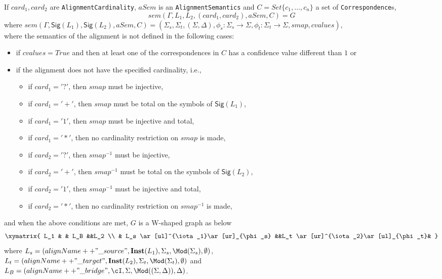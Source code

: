 \documentclass[10pt, a4paper]{isov2}
\newcommand*{\syntax}[1]{\texttt{#1}}
\newcommand{\Sig}{\mathsf{Sig}}
\newcommand{\Inst}{\ensuremath{\mathbf{Inst}}}
\begin{document}
If $card_1, card_2$ are \syntax{AlignmentCardinality},
$aSem$ is an \syntax{AlignmentSemantics}
and $C = Set\{c_1, \ldots, c_n\}$ a set of \syntax{Correspondence}s,
$$sem(\Gamma, L_1, L_2, (card_1,card_2), aSem, C)=
G$$
\noindent
where
$sem(\Gamma, \Sig(L_1),\Sig(L_2), aSem, C) = (\Sigma_s,\Sigma_t,(\Sigma,\Delta),\phi_s:\Sigma_s\to\Sigma,\phi_t:\Sigma_t\to\Sigma, smap, cvalues)$,\\
where the semantics of the alignment is not defined in the following cases:
\begin{itemize}
\item
if $cvalues = True$ and then at least one of the correspondences in $C$ has a confidence value different than $1$ or
\item if the alignment does not have the specified cardinality, i.e.,
\begin{itemize}
\item if $card_1 = '?'$, then $smap$ must be injective,
\item if $card_1 = '+'$, then $smap$ must be total on the symbols of $\Sig(L_1)$,
\item if $card_1 = '1'$, then $smap$ must be injective and total,
\item if $card_1 = '*'$, then no cardinality restriction on $smap$ is made,
\end{itemize}
\begin{itemize}
\item if $card_2 = '?'$, then $smap^{-1}$ must be injective,
\item if $card_2 = '+'$, then $smap^{-1}$ must be total on the symbols of $\Sig(L_2)$,
\item if $card_2 = '1'$, then $smap^{-1}$ must be injective and total,
\item if $card_2 = '*'$, then no cardinality restriction on $smap^{-1}$ is made,
\end{itemize}
\end{itemize}
\noindent and when the above conditions are met,
$G$ is a W-shaped graph as below
$$
\xymatrix{
L_1 & &  L_B &&L_2 \\
 & L_s \ar[ul]^{\iota_1}\ar[ur]_{\phi_s} &&L_t \ar[ur]^{\iota_2}\ar[ul]_{\phi_t}&
}
$$
where
$L_s = (alignName++"\_source", \Inst(L_1) ,\Sigma_s,\Mod(\Sigma_s),\emptyset)$,\\
$L_t = (alignName++"\_target", \Inst(L_2) ,\Sigma_t,\Mod(\Sigma_t),\emptyset)$ and\\
$L_B = (alignName++"\_bridge", \cI ,\Sigma,\Mod((\Sigma,\Delta)),\Delta)$.
\end{document}
